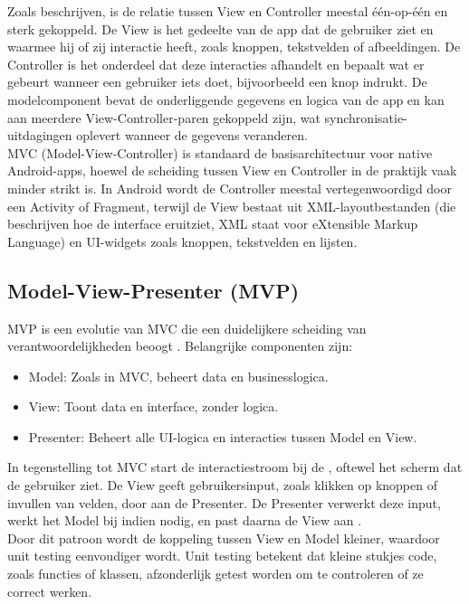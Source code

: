 Zoals \textcite{Lou2016} beschrijven, is de relatie tussen View en Controller meestal één-op-één en sterk gekoppeld. De View is het gedeelte van de app dat de gebruiker ziet en waarmee hij of zij interactie heeft, zoals knoppen, tekstvelden of afbeeldingen. De Controller is het onderdeel dat deze interacties afhandelt en bepaalt wat er gebeurt wanneer een gebruiker iets doet, bijvoorbeeld een knop indrukt. De modelcomponent bevat de onderliggende gegevens en logica van de app en kan aan meerdere View-Controller-paren gekoppeld zijn, wat synchronisatie-uitdagingen oplevert wanneer de gegevens veranderen.\\

MVC (Model-View-Controller) is standaard de basisarchitectuur voor native Android-apps, hoewel de scheiding tussen View en Controller in de praktijk vaak minder strikt is. In Android wordt de Controller meestal vertegenwoordigd door een Activity of Fragment, terwijl de View bestaat uit XML-layoutbestanden (die beschrijven hoe de interface eruitziet, XML staat voor eXtensible Markup Language) en UI-widgets zoals knoppen, tekstvelden en lijsten.\\

\subsection{Model-View-Presenter (MVP)}
MVP is een evolutie van MVC die een duidelijkere scheiding van verantwoordelijkheden beoogt \autocite{Lou2016}.  
Belangrijke componenten zijn:  
\begin{itemize}
	\item Model: Zoals in MVC, beheert data en businesslogica.  
	\item View: Toont data en interface, zonder logica.  
	\item Presenter: Beheert alle UI-logica en interacties tussen Model en View.  
\end{itemize}

In tegenstelling tot MVC start de interactiestroom bij de \View, oftewel het scherm dat de gebruiker ziet. De View geeft gebruikersinput, zoals klikken op knoppen of invullen van velden, door aan de Presenter. De Presenter verwerkt deze input, werkt het Model bij indien nodig, en past daarna de View aan \autocite{Lou2016}.\\

Door dit patroon wordt de koppeling tussen View en Model kleiner, waardoor unit testing eenvoudiger wordt. Unit testing betekent dat kleine stukjes code, zoals functies of klassen, afzonderlijk getest worden om te controleren of ze correct werken.\\

